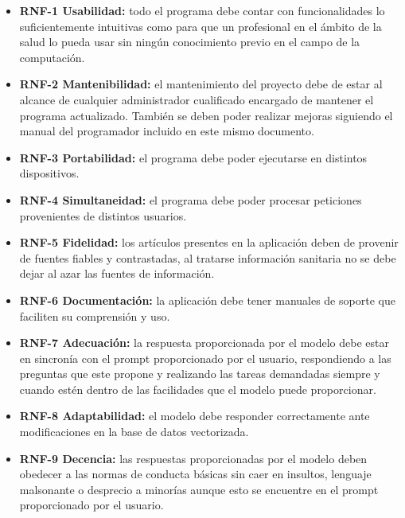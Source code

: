 \begin{itemize}
  \item \textbf{RNF-1 Usabilidad:} todo el programa debe contar con funcionalidades lo suficientemente intuitivas como para que un profesional en el ámbito de la salud lo pueda usar sin ningún conocimiento previo en el campo de la computación.
  
  \item \textbf{RNF-2 Mantenibilidad:} el mantenimiento del proyecto debe de estar al alcance de cualquier administrador cualificado encargado de mantener el programa actualizado. También se deben poder realizar mejoras siguiendo el manual del programador incluido en este mismo documento.
  
  \item \textbf{RNF-3 Portabilidad:} el programa debe poder ejecutarse en distintos dispositivos.
  
  \item \textbf{RNF-4 Simultaneidad:} el programa debe poder procesar peticiones provenientes de distintos usuarios.
  
  \item \textbf{RNF-5 Fidelidad:} los artículos presentes en la aplicación deben de provenir de fuentes fiables y contrastadas, al tratarse información sanitaria no se debe dejar al azar las fuentes de información.
  
  \item \textbf{RNF-6 Documentación:} la aplicación debe tener manuales de soporte que faciliten su comprensión y uso.
  
  \item \textbf{RNF-7 Adecuación:} la respuesta proporcionada por el modelo debe estar en sincronía con el prompt proporcionado por el usuario, respondiendo a las preguntas que este propone y realizando las tareas demandadas siempre y cuando estén dentro de las facilidades que el modelo puede proporcionar.

  \item \textbf{RNF-8 Adaptabilidad:} el modelo debe responder correctamente ante modificaciones en la base de datos vectorizada.

  \item \textbf{RNF-9 Decencia:} las respuestas proporcionadas por el modelo deben obedecer a las normas de conducta básicas sin caer en insultos, lenguaje malsonante o desprecio a minorías aunque esto se encuentre en el prompt proporcionado por el usuario.
  
\end{itemize}

